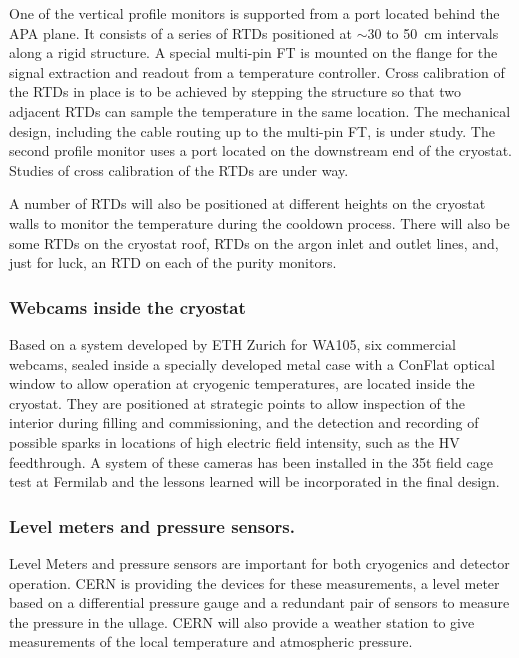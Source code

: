 One of  %
the vertical profile monitors is supported from a port located behind the APA plane. It consists of a series of RTDs positioned at $\sim$30 to 50~cm intervals %
along a rigid structure. %
A special multi-pin FT is mounted on the flange %
for the signal extraction and readout from a temperature controller.  Cross calibration of the RTDs in place is to be achieved by stepping the structure so that two adjacent RTDs can sample the temperature in the same location.
The mechanical design, including the cable routing up to the multi-pin FT, is under study.
The second profile monitor uses a port located on the downstream end of the cryostat. Studies of cross calibration of the RTDs are under way. 

A number of RTDs will also be positioned at different heights %
on the cryostat walls to monitor the temperature %
during the %
cooldown process. There will also be some RTDs on the cryostat roof,  RTDs on the argon inlet and outlet lines, and, just for luck, an RTD on each of the purity monitors.

\subsubsection{Webcams inside the cryostat}
	Based on %
	a system developed by ETH Zurich for WA105, six commercial webcams, sealed inside a specially developed metal case with a ConFlat optical window to allow operation at cryogenic temperatures, are located inside the cryostat. They are positioned at strategic points to allow inspection of the interior during filling and commissioning, %
	and the detection and recording of possible sparks in locations of high %
	electric field intensity, such as the HV feedthrough. A system of these cameras has been installed in the 35t field cage test at Fermilab and the lessons learned will be incorporated in the final design.
	
\subsubsection{Level meters and pressure sensors.}
	Level Meters and pressure sensors are important for both cryogenics and detector operation. CERN is providing the devices for these measurements, a level meter based on a differential pressure gauge and a redundant pair of sensors to measure the pressure in the ullage. CERN will also provide a weather station to give measurements of the local temperature and atmospheric pressure.


